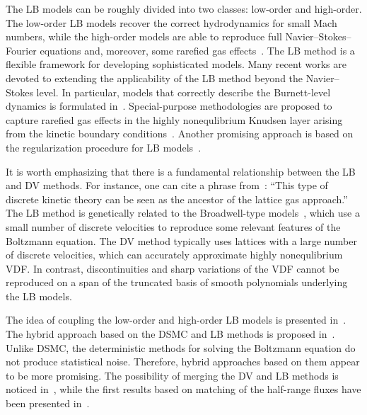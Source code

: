 \documentclass{elsarticle} %
\begin{document}
The LB models can be roughly divided into two classes: low-order and high-order.
The low-order LB models recover the correct hydrodynamics for small Mach numbers,
while the high-order models are able to reproduce full Navier--Stokes--Fourier equations
and, moreover, some rarefied gas effects~\cite{Succi2001, Shan2006}.
The LB method is a flexible framework for developing sophisticated models.
Many recent works are devoted to extending the applicability of the LB method beyond the Navier--Stokes level.
In particular, models that correctly describe the Burnett-level dynamics is formulated in~\cite{Xu2018, Xu2019}.
Special-purpose methodologies are proposed to capture rarefied gas effects in the highly nonequlibrium Knudsen layer
arising from the kinetic boundary conditions~\cite{Feuchter2016, Ambrus2014, Ambrus2016, Ambrus2016mixed}.
Another promising approach is based on the regularization procedure for LB models~\cite{Mont2015}.

It is worth emphasizing that there is a fundamental relationship between the LB and DV methods.
For instance, one can cite a phrase from~\cite{Rivet2001}:
``This type of discrete kinetic theory can be seen as the ancestor of the lattice gas approach.''
The LB method is genetically related to the Broadwell-type models~\cite{Broadwell1964shock, Gatignol1975},
which use a small number of discrete velocities to reproduce some relevant features of the Boltzmann equation.
The DV method typically uses lattices with a large number of discrete velocities,
which can accurately approximate highly nonequlibrium VDF.
In contrast, discontinuities and sharp variations of the VDF cannot be reproduced
on a span of the truncated basis of smooth polynomials underlying the LB models.

The idea of coupling the low-order and high-order LB models is presented in~\cite{Meng2011}.
The hybrid approach based on the DSMC and LB methods is proposed in~\cite{Staso2016long, Staso2018}.
Unlike DSMC, the deterministic methods for solving the Boltzmann equation do not produce statistical noise.
Therefore, hybrid approaches based on them appear to be more promising.
The possibility of merging the DV and LB methods is noticed in~\cite{Succi2016},
while the first results based on matching of the half-range fluxes have been presented in~\cite{Ilyin2018}.

\end{document}
